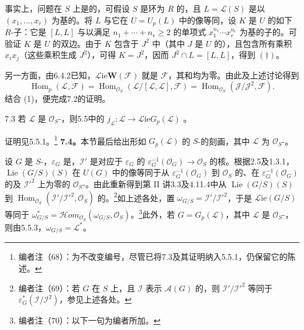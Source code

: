 事实上，问题在 $S$ 上是的，可假设 $S$ 是环为 $R$ 的，且 $L=\mathcal L(S)$ 是以 $(x_1,\ldots,x_r)$ 为基的。将 $L$ 与它在 $U=U_p(L)$ 中的像等同，设 $K$ 是 $U$ 的如下 $R$-子：它是 $[L,L]$ 与以满足 $n_1+\cdots+n_r\ge2$ 的单项式 $x_1^{n_1}\cdots x_r^{n_r}$ 为基的子的。可验证 $K$ 是 $U$ 的双边。由于 $K$ 包含于 $J^2$ 中（其中 $J$ 是 $U$ 的），且包含所有乘积 $x_ix_j$（这些乘积生成 $J^2$），可得 $K=J^2$，因而 $J^2\cap L=[L,L]$，得到 $(\dagger)$。

另一方面，由6.4.2已知，$\mathscr{L}\mathrm{ie}\mathbf W(\mathcal F)$ 就是 $\mathcal F$，其和均为零。由此及上述讨论得到
\[
 \operatorname{Hom}_p(\mathcal L,\mathcal F)
 =\operatorname{Hom}_{\mathcal O_S}(\mathcal L/[\mathcal L,\mathcal L],\mathcal F)
 =\operatorname{Hom}_{\mathcal O_S}(\mathcal J/\mathcal J^2,\mathcal F).\tag{2}
\]
结合 (1)，便完成7.2的证明。

\begin{SGAresult}{}{7.3}
若 $\mathcal L$ 是 $\mathcal O_S$-，则5.5中的 $j_{\mathcal L}:\mathcal L\to\mathscr{L}\mathrm{ie}G_p(\mathcal L)$ 。
\end{SGAresult}
证明见5.5.1。\footnote{编者注（68）：为不改变编号，尽管已将7.3及其证明纳入5.5.1，仍保留它的陈述。}
\textbf{7.4。}本节最后给出形如 $G_p(\mathcal L)$ 的 $S$-的刻画，其中 $\mathcal L$ 为 $\mathcal O_S$-。

设 $G$ 是 $S$-，$\varepsilon_G$ 是，$\mathcal I'$ 是对应于 $\varepsilon_G$ 的 $\varepsilon_G^{-1}(\mathcal O_G)\to\mathcal O_S$ 的核。根据2.5及1.3.1，$\operatorname{Lie}(G/S)(S)$ 在 $U(G)$ 中的像等同于从 $\varepsilon_G^{-1}(\mathcal O_G)$ 到 $\mathcal O_S$ 的、在 $\varepsilon_G^{-1}(\mathcal O_G)$ 的及 $\mathcal I'^2$ 上为零的 $\mathcal O_S$-。由此重新得到第 II 讲3.3及4.11.4中从 $\operatorname{Lie}(G/S)(S)$ 到 $\operatorname{Hom}_{\mathcal O_S}(\mathcal I'/\mathcal I'^2,\mathcal O_S)$ 的。\footnote{编者注（69）：若 $G$ 在 $S$ 上，且 $\mathcal I$ 表示 $\mathcal A(G)$ 的，则 $\mathcal I'/\mathcal I'^2$ 等同于 $\varepsilon_G^*(\mathcal I/\mathcal I^2)$，参见上述各处。}如上述各处，置 $\omega_{G/S}=\mathcal I'/\mathcal I'^2$，于是 $\mathscr{L}\mathrm{ie}(G/S)$ 等同于 $\omega_{G/S}^*=\mathcal Hom_{\mathcal O_S}(\omega_{G/S},\mathcal O_S)$。\footnote{编者注（70）：以下一句为编者所加。}此外，若 $G=G_p(\mathcal L)$，其中 $\mathcal L$ 是 $\mathcal O_S$-，则由5.5.3，$\omega_{G/S}=\mathcal L^*$。


